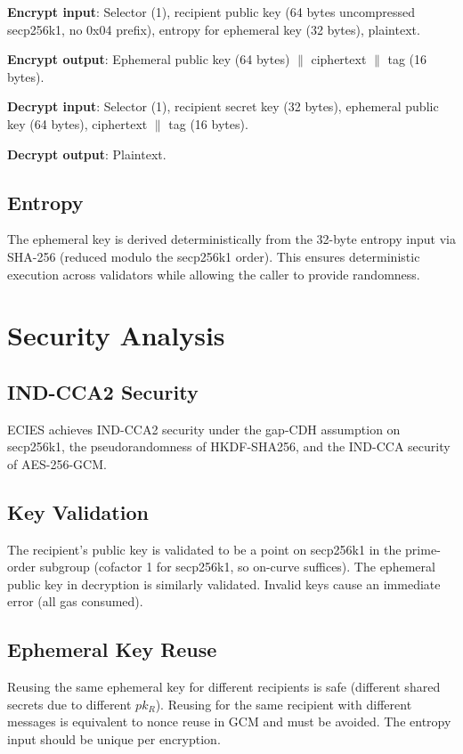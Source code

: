 \documentclass[11pt,a4paper]{article}
\begin{document}
\textbf{Encrypt input}: Selector (1), recipient public key (64 bytes uncompressed
secp256k1, no 0x04 prefix), entropy for ephemeral key (32 bytes), plaintext.

\textbf{Encrypt output}: Ephemeral public key (64 bytes) $\|$ ciphertext $\|$ tag (16 bytes).

\textbf{Decrypt input}: Selector (1), recipient secret key (32 bytes), ephemeral
public key (64 bytes), ciphertext $\|$ tag (16 bytes).

\textbf{Decrypt output}: Plaintext.

\subsection{Entropy}

The ephemeral key is derived deterministically from the 32-byte entropy input
via SHA-256 (reduced modulo the secp256k1 order). This ensures deterministic
execution across validators while allowing the caller to provide randomness.

\section{Security Analysis}

\subsection{IND-CCA2 Security}

ECIES achieves IND-CCA2 security under the gap-CDH assumption on secp256k1,
the pseudorandomness of HKDF-SHA256, and the IND-CCA security of AES-256-GCM.

\subsection{Key Validation}

The recipient's public key is validated to be a point on secp256k1 in the
prime-order subgroup (cofactor 1 for secp256k1, so on-curve suffices).
The ephemeral public key in decryption is similarly validated. Invalid keys
cause an immediate error (all gas consumed).

\subsection{Ephemeral Key Reuse}

Reusing the same ephemeral key for different recipients is safe (different
shared secrets due to different $pk_R$). Reusing for the same recipient with
different messages is equivalent to nonce reuse in GCM and must be avoided.
The entropy input should be unique per encryption.
\end{document}
